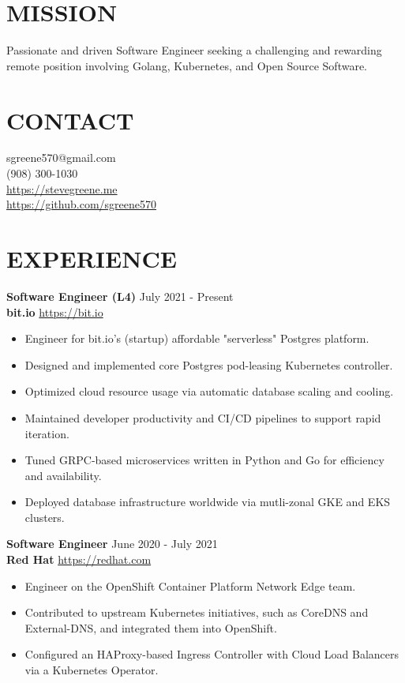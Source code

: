 \documentclass[line, margin, 10.5pt]{res}
\begin{document}

\begin{resume}

\section{\small MISSION}
Passionate and driven Software Engineer seeking a challenging and rewarding remote position involving Golang, Kubernetes, and Open Source Software.

\section{\small CONTACT}
sgreene570@gmail.com \\
(908) 300-1030 \\
\url{https://stevegreene.me} \\
\url{https://github.com/sgreene570}

\section{\small EXPERIENCE}
{\bf \large{Software Engineer (L4)}} \hfill July 2021 - Present \\
{\bf bit.io} \hfill \url{https://bit.io}
\begin{itemize}
    \item Engineer for bit.io's (startup) affordable "serverless" Postgres platform.
    \item Designed and implemented core Postgres pod-leasing Kubernetes controller.
    \item Optimized cloud resource usage via automatic database scaling and cooling.
    \item Maintained developer productivity and CI/CD pipelines to support rapid iteration.
    \item Tuned GRPC-based microservices written in Python and Go for efficiency and availability.
    \item Deployed database infrastructure worldwide via mutli-zonal GKE and EKS clusters.
\end{itemize}

{\bf \large{Software Engineer}} \hfill June 2020 - July 2021 \\
{\bf Red Hat} \hfill \url{https://redhat.com}
\begin{itemize}
    \item Engineer on the OpenShift Container Platform Network Edge team.
    \item Contributed to upstream Kubernetes initiatives, such as CoreDNS and External-DNS, and integrated them into OpenShift.
    \item Configured an HAProxy-based Ingress Controller with Cloud Load Balancers via a Kubernetes Operator.
\end{itemize}


\end{resume}
\end{document}
